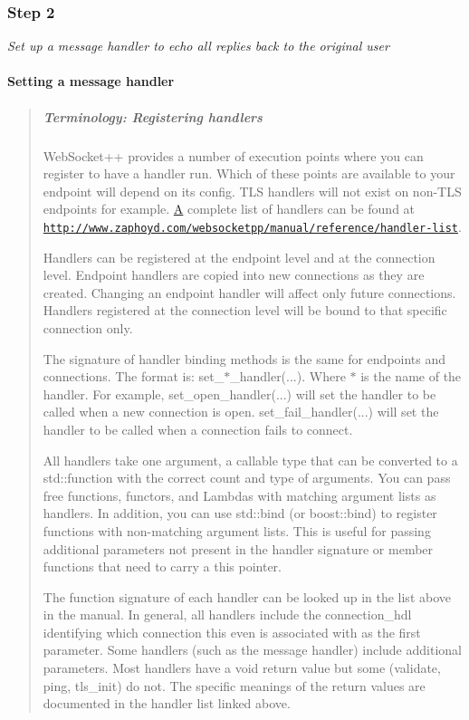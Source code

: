 \subsubsection*{Step 2}

{\itshape Set up a message handler to echo all replies back to the original user}

\paragraph*{Setting a message handler}

\begin{quote}
\subparagraph*{Terminology\+: Registering handlers}

Web\+Socket++ provides a number of execution points where you can register to have a handler run. Which of these points are available to your endpoint will depend on its config. T\+LS handlers will not exist on non-\/\+T\+LS endpoints for example. \mbox{\hyperlink{struct_a}{A}} complete list of handlers can be found at \href{http://www.zaphoyd.com/websocketpp/manual/reference/handler-list}{\tt http\+://www.\+zaphoyd.\+com/websocketpp/manual/reference/handler-\/list}.

Handlers can be registered at the endpoint level and at the connection level. Endpoint handlers are copied into new connections as they are created. Changing an endpoint handler will affect only future connections. Handlers registered at the connection level will be bound to that specific connection only.

The signature of handler binding methods is the same for endpoints and connections. The format is\+: {\ttfamily set\+\_\+$\ast$\+\_\+handler(...)}. Where $\ast$ is the name of the handler. For example, {\ttfamily set\+\_\+open\+\_\+handler(...)} will set the handler to be called when a new connection is open. {\ttfamily set\+\_\+fail\+\_\+handler(...)} will set the handler to be called when a connection fails to connect.

All handlers take one argument, a callable type that can be converted to a {\ttfamily std\+::function} with the correct count and type of arguments. You can pass free functions, functors, and Lambdas with matching argument lists as handlers. In addition, you can use {\ttfamily std\+::bind} (or {\ttfamily boost\+::bind}) to register functions with non-\/matching argument lists. This is useful for passing additional parameters not present in the handler signature or member functions that need to carry a \textquotesingle{}this\textquotesingle{} pointer.

The function signature of each handler can be looked up in the list above in the manual. In general, all handlers include the {\ttfamily connection\+\_\+hdl} identifying which connection this even is associated with as the first parameter. Some handlers (such as the message handler) include additional parameters. Most handlers have a void return value but some ({\ttfamily validate}, {\ttfamily ping}, {\ttfamily tls\+\_\+init}) do not. The specific meanings of the return values are documented in the handler list linked above. \end{quote}


